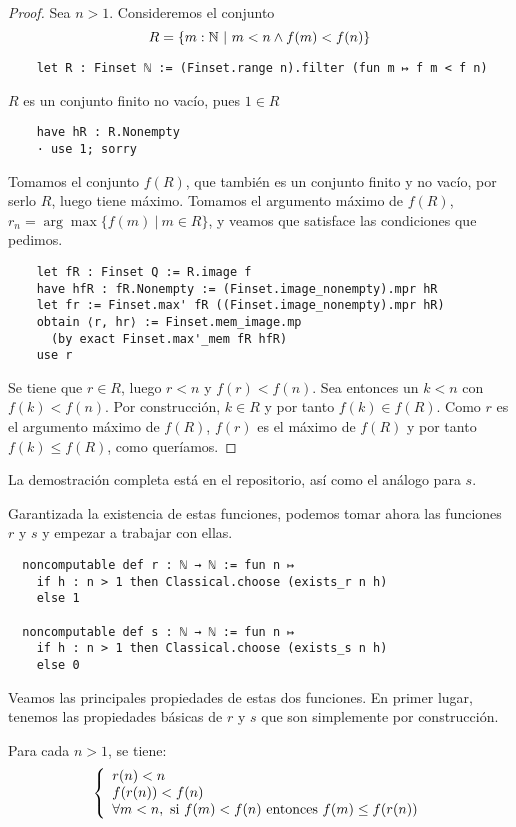 \begin{proof}
  Sea $n>1$. Consideremos el conjunto
  $$
  R = \{m : \mathbb{N} ~|~ m < n \land f(m) < f(n)\}
  $$
  \begin{lstlisting}
    let R : Finset ℕ := (Finset.range n).filter (fun m ↦ f m < f n) \end{lstlisting}
  $R$ es un conjunto finito no vacío, pues $1 \in R$
  \begin{lstlisting}
    have hR : R.Nonempty
    · use 1; sorry \end{lstlisting}

  Tomamos el conjunto $f(R)$, que también es un conjunto finito y no vacío, por serlo $R$, luego tiene máximo. Tomamos el argumento máximo de $f(R)$, $r_n = \arg \max \{f(m) ~|~ m \in R\}$, y veamos que satisface las condiciones que pedimos.

  \begin{lstlisting}
    let fR : Finset Q := R.image f
    have hfR : fR.Nonempty := (Finset.image_nonempty).mpr hR
    let fr := Finset.max' fR ((Finset.image_nonempty).mpr hR)
    obtain ⟨r, hr⟩ := Finset.mem_image.mp
      (by exact Finset.max'_mem fR hfR)
    use r \end{lstlisting}

  Se tiene que $r \in R$, luego $r < n$ y $f(r) < f(n)$. Sea entonces un $k < n$ con $f(k) < f(n)$. Por construcción, $k \in R$ y por tanto $f(k) \in f(R)$. Como $r$ es el argumento máximo de $f(R)$, $f(r)$ es el máximo de $f(R)$ y por tanto $f(k) \leq f(R)$, como queríamos.
\end{proof}

La demostración completa está en el repositorio, así como el análogo para $s$.

Garantizada la existencia de estas funciones, podemos tomar ahora las funciones $r$ y $s$ y empezar a trabajar con ellas.

\begin{lstlisting}
  noncomputable def r : ℕ → ℕ := fun n ↦
    if h : n > 1 then Classical.choose (exists_r n h)
    else 1

  noncomputable def s : ℕ → ℕ := fun n ↦
    if h : n > 1 then Classical.choose (exists_s n h)
    else 0
\end{lstlisting}

Veamos las principales propiedades de estas dos funciones. En primer lugar, tenemos las propiedades básicas de $r$ y $s$ que son simplemente por construcción.

\begin{lemma}
  Para cada $n > 1$, se tiene:
  $$
  \left\{
    \begin{array}{l}
      r(n) < n \\
      f(r(n)) < f (n) \\
      \forall m < n, \textnormal{ si } f(m) < f(n) \textnormal{ entonces } f(m) \leq f(r(n))
    \end{array}
  \right.
  $$
\end{lemma}


